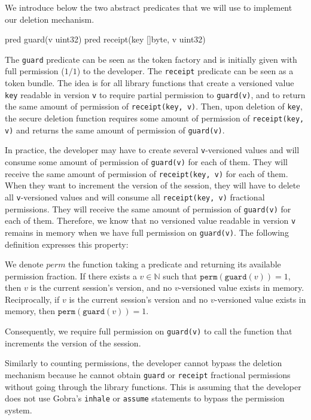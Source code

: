 We introduce below the two abstract predicates that we will use to implement our deletion mechanism.

\begin{gobra}
pred guard(v uint32)
pred receipt(key []byte, v uint32)
\end{gobra}

The \texttt{guard} predicate can be seen as the token factory and is initially given with full permission ($1/1$) to the developer.
The \texttt{receipt} predicate can be seen as a token bundle.
The idea is for all library functions that create a versioned value \texttt{key} readable in version \texttt{v} to require partial permission to \texttt{guard(v)}, and to return the same amount of permission of \texttt{receipt(key, v)}.
Then, upon deletion of \texttt{key}, the secure deletion function requires some amount of permission of \texttt{receipt(key, v)} and returns the same amount of permission of \texttt{guard(v)}.

In practice, the developer may have to create several \texttt{v}-versioned values and will consume some amount of permission of \texttt{guard(v)} for each of them.
They will receive the same amount of permission of \texttt{receipt(key, v)} for each of them.
When they want to increment the version of the session, they will have to delete all \texttt{v}-versioned values and will consume all \texttt{receipt(key, v)} fractional permissions.
They will receive the same amount of permission of \texttt{guard(v)} for each of them.
Therefore, we know that no versioned value readable in version \texttt{v} remains in memory when we have full permission on \texttt{guard(v)}.
The following definition expresses this property:

\begin{definition}\label{def:full-guard-no-versioned-value}
    We denote $perm$ the function taking a predicate and returning its available permission fraction.
    If there exists a $v \in \mathbb{N}$ such that $\texttt{perm}(\texttt{guard}(v)) = 1$, then $v$ is the current session's version, and no $v$-versioned value exists in memory.
    Reciprocally, if $v$ is the current session's version and no $v$-versioned value exists in memory, then $\texttt{perm}(\texttt{guard}(v)) = 1$.
\end{definition}

Consequently, we require full permission on \texttt{guard(v)} to call the function that increments the version of the session.

Similarly to counting permissions, the developer cannot bypass the deletion mechanism because he cannot obtain \texttt{guard} or \texttt{receipt} fractional permissions without going through the library functions.
This is assuming that the developer does not use Gobra's \texttt{inhale} or \texttt{assume} statements to bypass the permission system.

